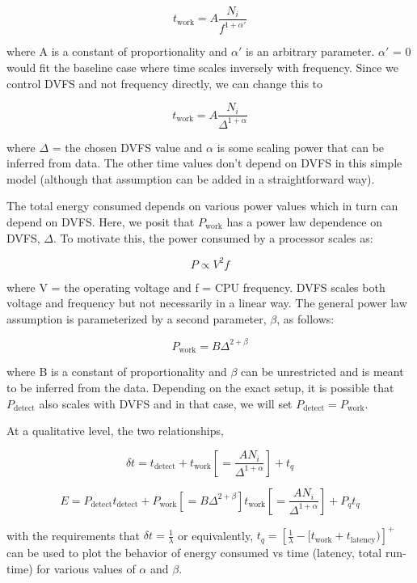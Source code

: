 $$t_{\text{work}} = A\frac{N_i}{f^{1+\alpha'}}$$

where A is a constant of proportionality and $\alpha'$ is an arbitrary parameter. $\alpha'$ = 0 would fit the baseline case where time scales inversely with frequency. Since we control DVFS and not frequency directly, we can change this to

$$t_{\text{work}} = A\frac{N_i}{\Delta^{1+\alpha}}$$

where $\Delta$ = the chosen DVFS value and $\alpha$ is some scaling power that can be inferred from data. The other time values don't depend on DVFS in this simple model (although that assumption can be added in a straightforward way).

The total energy consumed depends on various power values which in turn can depend on DVFS. Here, we posit that $P_{\text{work}}$ has a power law dependence on DVFS, $\Delta$. To motivate this, the power consumed by a processor scales as:

$$P \propto V^2 f$$

where V = the operating voltage and f = CPU frequency. DVFS scales both voltage and frequency but not necessarily in a linear way. The general power law assumption is parameterized by a second parameter, $\beta$, as follows:

$$P_{\text{work}} = B \Delta^{2+\beta}$$

where B is a constant of proportionality and $\beta$ can be unrestricted and is meant to be inferred from the data. Depending on the exact setup, it is possible that $P_{\text{detect}}$ also scales with DVFS and in that case, we will set $P_{\text{detect}} = P_{\text{work}}$.

At a qualitative level, the two relationships,

\begin{equation}
    \delta t = t_{\text{detect}} + t_{\text{work}} [=\frac{AN_i}{\Delta^{1+\alpha}}] + t_q
\end{equation}

\begin{equation}
    E = P_\text{detect} t_{\text{detect}} + P_{\text{work}}[=B\Delta^{2+\beta}] t_{\text{work}}[=\frac{AN_i}{\Delta^{1+\alpha}}] + P_q t_q
\end{equation}

with the requirements that $\delta t = \frac{1}{\lambda}$ or equivalently, $t_q = \left[\frac{1}{\lambda} - [t_\text{work}+t_\text{latency}) \right]^+$ can be used to plot the behavior of energy consumed vs time (latency, total run-time) for various values of $\alpha$ and $\beta$.

